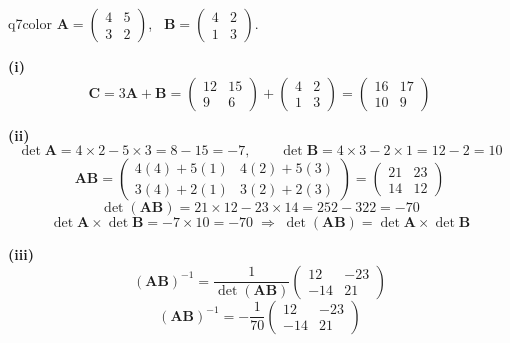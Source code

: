 \documentclass[11pt,a4paper]{article}
\begin{document}
\begin{ansbox}{q7color}
$\mathbf{A}=\begin{pmatrix}4&5\\3&2\end{pmatrix}$, \ $\mathbf{B}=\begin{pmatrix}4&2\\1&3\end{pmatrix}$.

\textbf{(i)}
\[ \mathbf{C}=3\mathbf{A}+\mathbf{B}=\begin{pmatrix}12&15\\9&6\end{pmatrix}+\begin{pmatrix}4&2\\1&3\end{pmatrix}=\boxed{\begin{pmatrix}16&17\\10&9\end{pmatrix}} \]

\textbf{(ii)}
\[ \det\mathbf{A}=4\times2-5\times3=8-15=-7, \qquad \det\mathbf{B}=4\times3-2\times1=12-2=10 \]
\[ \mathbf{AB}=\begin{pmatrix}4(4)+5(1)&4(2)+5(3)\\3(4)+2(1)&3(2)+2(3)\end{pmatrix}=\begin{pmatrix}21&23\\14&12\end{pmatrix} \]
\[ \det(\mathbf{AB})=21\times12-23\times14=252-322=-70 \]
\[ \det\mathbf{A}\times\det\mathbf{B}=-7\times10=-70 \;\Rightarrow\; \boxed{\det(\mathbf{AB})=\det\mathbf{A}\times\det\mathbf{B}} \]

\textbf{(iii)}
\[ (\mathbf{AB})^{-1}=\frac{1}{\det(\mathbf{AB})}\begin{pmatrix}12&-23\\-14&21\end{pmatrix} \]
\[ \boxed{(\mathbf{AB})^{-1}=-\frac{1}{70}\begin{pmatrix}12&-23\\-14&21\end{pmatrix}} \]
\end{ansbox}
\end{document}
